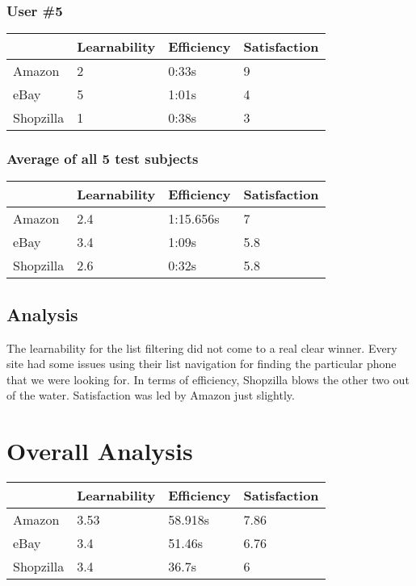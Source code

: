 \documentclass[11pt, oneside]{article}   	%
\begin{document}
\subsubsection{User \#5}

\begin{tabular}{| l | l | l | l |}
    \hline
     & Learnability & Efficiency & Satisfaction \\ \hline
    Amazon & 2 & 0:33s & 9 \\ \hline
    eBay & 5 & 1:01s & 4 \\ \hline
    Shopzilla & 1 & 0:38s & 3 \\\hline
\end{tabular}

\subsubsection{Average of all 5 test subjects}

\begin{tabular}{| l | l | l | l |}
    \hline
     & Learnability & Efficiency & Satisfaction \\ \hline
    Amazon & 2.4 & 1:15.656s & 7 \\ \hline
    eBay & 3.4 & 1:09s & 5.8 \\ \hline
    Shopzilla & 2.6 & 0:32s & 5.8 \\\hline
\end{tabular}

\subsection{Analysis}
The learnability for the list filtering did not come to a real clear winner. Every site had some issues using their list navigation for finding the particular phone that we were looking for. In terms of efficiency, Shopzilla blows the other two out of the water. Satisfaction was led by Amazon just slightly.

\section{Overall Analysis}
\begin{tabular}{| l | l | l | l |}
    \hline
     & Learnability & Efficiency & Satisfaction \\ \hline
    Amazon & 3.53 & 58.918s & 7.86 \\ \hline
    eBay & 3.4 & 51.46s & 6.76 \\ \hline
    Shopzilla & 3.4 & 36.7s & 6 \\ \hline
\end{tabular}
\end{document}
